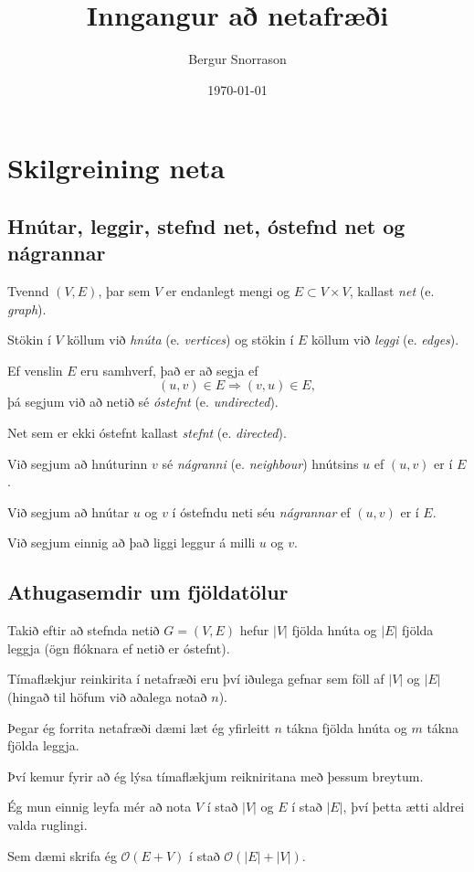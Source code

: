\title{Inngangur að netafræði}
\author{Bergur Snorrason}
\date{\today}



\frame{\titlepage}

\section{Skilgreining neta}
\subsection{Hnútar, leggir, stefnd net, óstefnd net og nágrannar}
{
    {
        \item<1-> Tvennd $(V, E)$, þar sem $V$ er endanlegt mengi og $E \subset V \times V$, kallast \emph{net} (e. \emph{graph}).
        \item<2-> Stökin í $V$ köllum við \emph{hnúta} (e. \emph{vertices}) og stökin í $E$ köllum við \emph{leggi} (e. \emph{edges}).
        \item<3-> Ef venslin $E$ eru samhverf, það er að segja ef 
            \[
                (u, v) \in E \Rightarrow (v, u) \in E,
            \]
            þá segjum við að netið sé \emph{óstefnt} (e. \emph{undirected}).
        \item<4-> Net sem er ekki óstefnt kallast \emph{stefnt} (e. \emph{directed}).
        \item<5-> Við segjum að hnúturinn $v$ sé \emph{nágranni} (e. \emph{neighbour}) hnútsins $u$ ef $(u, v)$ er í $E$.
        \item<6-> Við segjum að hnútar $u$ og $v$ í óstefndu neti séu \emph{nágrannar} ef $(u, v)$ er í $E$.
        \item<7-> Við segjum einnig að það liggi leggur á milli $u$ og $v$.
    }
}

\subsection{Athugasemdir um fjöldatölur}
{
    {
        \item<1-> Takið eftir að stefnda netið $G = (V, E)$ hefur $|V|$ fjölda hnúta og $|E|$ fjölda leggja (ögn flóknara ef netið er óstefnt).
        \item<2-> Tímaflækjur reinkirita í netafræði eru því iðulega gefnar sem föll af $|V|$ og $|E|$ (hingað til höfum við aðalega notað $n$).
        \item<3-> Þegar ég forrita netafræði dæmi læt ég yfirleitt $n$ tákna fjölda hnúta og $m$ tákna fjölda leggja.
        \item<4-> Því kemur fyrir að ég lýsa tímaflækjum reikniritana með þessum breytum.
        \item<5-> Ég mun einnig leyfa mér að nota $V$ í stað $|V|$ og $E$ í stað $|E|$, því þetta ætti aldrei valda ruglingi.
        \item<6-> Sem dæmi skrifa ég $\mathcal{O}(E + V)$ í stað $\mathcal{O}(|E| + |V|)$.
    }
}

